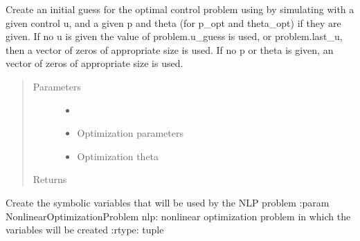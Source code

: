 \documentclass[letterpaper,10pt,english]{sphinxmanual}
\begin{document}
\begin{fulllineitems}
\begin{fulllineitems}
\label{\detokenize{yaocptool.methods.classic:yaocptool.methods.classic.collocationscheme.CollocationScheme.create_initial_guess_with_simulation}}
Create an initial guess for the optimal control problem using by simulating with a given control u,
and a given p and theta (for p\_opt and theta\_opt) if they are given.
If no u is given the value of problem.u\_guess is used, or problem.last\_u, then a vector of zeros of appropriate
size is used.
If no p or theta is given, an vector of zeros of appropriate size is used.
\begin{quote}\begin{description}
\item[{Parameters}] \leavevmode\begin{itemize}
\item {} 
 \textendash{} 

\item {} 
 \textendash{} Optimization parameters

\item {} 
 \textendash{} Optimization theta

\end{itemize}

\item[{Returns}] \leavevmode


\end{description}\end{quote}

\end{fulllineitems}


\begin{fulllineitems}
\label{\detokenize{yaocptool.methods.classic:yaocptool.methods.classic.collocationscheme.CollocationScheme.create_nlp_symbolic_variables}}
Create the symbolic variables that will be used by the NLP problem
:param NonlinearOptimizationProblem nlp: nonlinear optimization problem in which the variables will be created
:rtype: tuple


\end{fulllineitems}
\end{fulllineitems}
\end{document}
